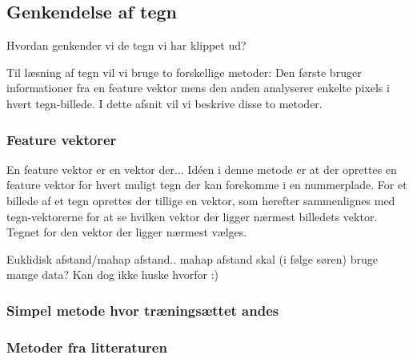 \subsection{Genkendelse af tegn}
Hvordan genkender vi de tegn vi har klippet ud?
\label{sec_monster}

\begin{comment}
Noter fra møde med Søren 20/2:
Opret feature vektor $f$ for hvert bogstav $\omega$
Finde middelværdivektor for hvert $\omega$.
Afstandsfunktion: den afstand til en middelværdivektor der er mindst, vælges. Dvs. det bogstav vælges.
Featurevektorafstand udregnes hver gang

Euklidisk afstand
En-eller-anden mahap afstand
\end{comment}


Til læsning af tegn vil vi bruge to forskellige metoder: Den første bruger informationer fra en feature vektor mens den anden analyserer enkelte pixels i hvert tegn-billede. I dette afsnit vil vi beskrive disse to metoder.

\subsubsection{Feature vektorer}
En feature vektor er en vektor der... Idéen i denne metode er at der oprettes en feature vektor for hvert muligt tegn der kan forekomme i en nummerplade. For et billede af et tegn oprettes der tillige en vektor, som herefter sammenlignes med tegn-vektorerne for at se hvilken vektor der ligger nærmest billedets vektor. Tegnet for den vektor der ligger nærmest vælges.

Euklidisk afstand/mahap afstand.. mahap afstand skal (i følge søren) bruge mange data? Kan dog ikke huske hvorfor :)

\subsubsection{Simpel metode hvor træningsættet andes}

\subsubsection{Metoder fra litteraturen}
